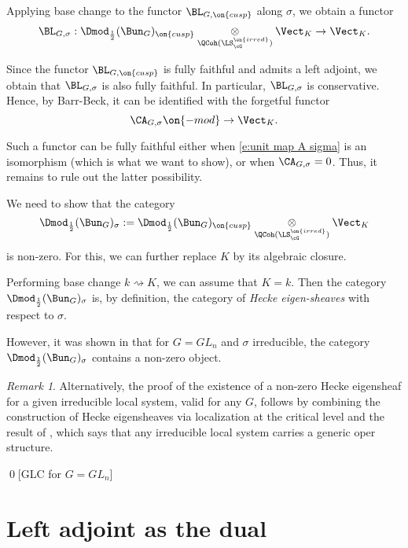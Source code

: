 \documentclass[9pt]{amsart}
\theoremstyle{remark}
\newtheorem{rem}[subsubsection]{Remark}
\theoremstyle{definition}
\theoremstyle{remark}
\numberwithin{equation}{section}
\renewcommand{\mod}{{\on{-mod}}}
\begin{document}
\medskip

Applying base change to the functor $\BL_{G,\on{cusp}}$ along $\sigma$, we obtain a functor
$$\BL_{G,\sigma}:\Dmod_{\frac{1}{2}}(\Bun_G)_{\on{cusp}} \underset{\QCoh(\LS^{\on{irred}}_\cG)}\otimes \Vect_K\to \Vect_K.$$

Since the functor $\BL_{G,\on{cusp}}$ is fully faithful and admits a left adjoint, we obtain that $\BL_{G,\sigma}$ is also
fully faithful. In particular, $\BL_{G,\sigma}$ is conservative.
Hence, by Barr-Beck, it can be identified with the forgetful functor
$$\CA_{G,\sigma}\mod \to \Vect_K.$$

Such a functor can be fully faithful either when \eqref{e:unit map A sigma} is an isomorphism (which is what we want to show), or when 
$\CA_{G,\sigma}=0$. Thus, it remains to rule out the latter possibility. 

\sssec{}

We need to show that the category 
$$\Dmod_{\frac{1}{2}}(\Bun_G)_\sigma:=\Dmod_{\frac{1}{2}}(\Bun_G)_{\on{cusp}} \underset{\QCoh(\LS^{\on{irred}}_\cG)}\otimes \Vect_K$$
is non-zero. For this, we can further replace $K$ by its algebraic closure. 

\medskip

Performing base change $k\rightsquigarrow K$, we can assume that $K=k$. Then the category $\Dmod_{\frac{1}{2}}(\Bun_G)_\sigma$
is, by definition, the category of \emph{Hecke eigen-sheaves} with respect to $\sigma$.

\medskip

However, it was shown in \cite{FGV} that for $G=GL_n$ and $\sigma$ irreducible, the category $\Dmod_{\frac{1}{2}}(\Bun_G)_\sigma$ contains a non-zero object.

\begin{rem}

Alternatively, the proof of the existence of a non-zero Hecke eigensheaf for a given irreducible local system, valid for any $G$, 
follows by combining the \cite{BD1} construction of Hecke eigensheaves via localization at the critical level and the result of \cite{Ari},
which says that any irreducible local system carries a generic oper structure. 

\end{rem}

\qed[GLC for $G=GL_n$]

\section{Left adjoint as the dual} \label{s:left}
\end{document}
